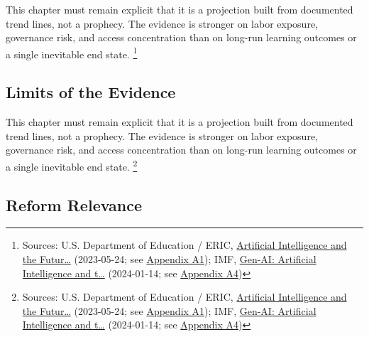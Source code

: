 \documentclass[
  american,
  11pt,
  letterpaper,
]{article}
\begin{document}
This chapter must remain explicit that it is a projection built from
documented trend lines, not a prophecy. The evidence is stronger on
labor exposure, governance risk, and access concentration than on
long-run learning outcomes or a single inevitable end state. \footnote{Sources:
  U.S. Department of Education / ERIC,
  \href{https://eric.ed.gov/?id=ED631097}{Artificial Intelligence and
  the Futur\ldots{}} (2023-05-24; see
  \hyperref[ch-09-appendix-a1-artificial-intelligence-and-the-future-of-teaching-and-learning-insights-and-recommendations]{Appendix
  A1}); IMF,
  \href{https://www.imf.org/en/publications/staff-discussion-notes/issues/2024/01/14/gen-ai-artificial-intelligence-and-the-future-of-work-542379}{Gen-AI:
  Artificial Intelligence and t\ldots{}} (2024-01-14; see
  \hyperref[ch-09-appendix-a4-gen-ai-artificial-intelligence-and-the-future-of-work]{Appendix
  A4})}

\subsection{Limits of the Evidence}\label{limits-of-the-evidence-9}

This chapter must remain explicit that it is a projection built from
documented trend lines, not a prophecy. The evidence is stronger on
labor exposure, governance risk, and access concentration than on
long-run learning outcomes or a single inevitable end state. \footnote{Sources:
  U.S. Department of Education / ERIC,
  \href{https://eric.ed.gov/?id=ED631097}{Artificial Intelligence and
  the Futur\ldots{}} (2023-05-24; see
  \hyperref[ch-09-appendix-a1-artificial-intelligence-and-the-future-of-teaching-and-learning-insights-and-recommendations]{Appendix
  A1}); IMF,
  \href{https://www.imf.org/en/publications/staff-discussion-notes/issues/2024/01/14/gen-ai-artificial-intelligence-and-the-future-of-work-542379}{Gen-AI:
  Artificial Intelligence and t\ldots{}} (2024-01-14; see
  \hyperref[ch-09-appendix-a4-gen-ai-artificial-intelligence-and-the-future-of-work]{Appendix
  A4})}

\subsection{Reform Relevance}\label{reform-relevance-9}
\end{document}
